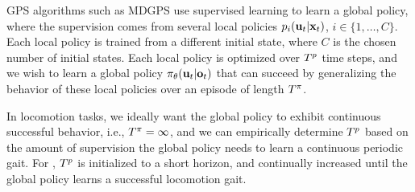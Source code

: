 
GPS algorithms such as MDGPS use supervised learning to learn a global policy,
where the supervision comes from several local policies $p_i(\mathbf{u}_t|\mathbf{x}_t)$,
$i\in\{1,\ldots,C\}$. Each local policy is trained from a different initial
state, where $C$ is the chosen number of initial states. Each local policy is
optimized over $T^{p}$ time steps, and we wish to learn a global policy
$\pi_{\theta}(\mathbf{u}_t|\mathbf{o}_t)$ that can succeed by generalizing the behavior of
these local policies over an episode of length $T^{\pi}$.

In locomotion
tasks, we ideally want the global policy to exhibit continuous successful
behavior, i.e., $T^{\pi}=\infty$, and we can empirically determine
$T^{p}$ based on the amount of supervision the global policy needs to
learn a continuous periodic gait.
For \SB{}, $T^{p}$ is initialized to a short horizon, and continually increased 
until the global policy learns a successful locomotion gait.

